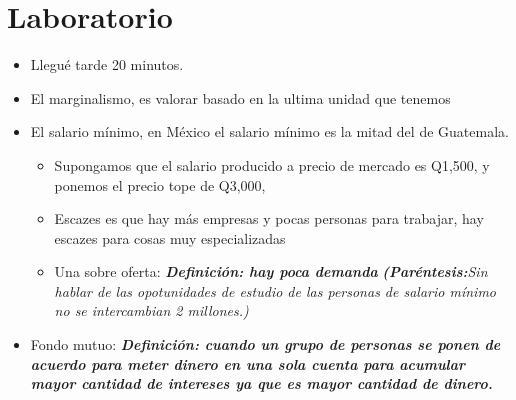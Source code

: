 \section{Laboratorio}
\begin{itemize}
    \item Llegué tarde 20 minutos.
    \item El marginalismo, es valorar basado en la ultima unidad que tenemos
    \item El salario mínimo, en México el salario mínimo es la mitad del de Guatemala.
    \begin{itemize}
        \item Supongamos que el salario producido a precio de mercado es Q1,500, y ponemos el precio tope de Q3,000, 
        \item Escazes es que hay más empresas y pocas personas para trabajar, hay escazes para cosas muy especializadas
        \item Una sobre oferta: \textbf{\emph{Definición: hay poca demanda}} \emph{\textbf{(Paréntesis:}Sin hablar de las opotunidades de estudio de las personas de salario mínimo no se intercambian 2 millones.)}
    \end{itemize}
    \item Fondo mutuo: \textbf{\emph{Definición: cuando un grupo de personas se ponen de acuerdo para meter dinero en una sola cuenta para acumular mayor cantidad de intereses ya que es mayor cantidad de dinero.}}
\end{itemize}
